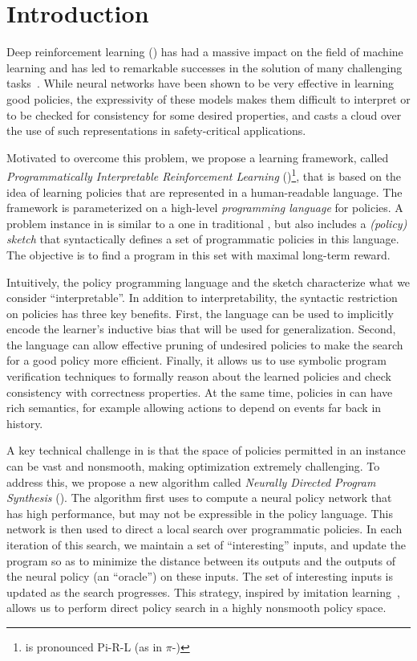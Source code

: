 \section{Introduction}\label{sec:intro}

Deep reinforcement learning (\drl) has had a massive impact on the
field of machine learning and has led to remarkable successes in the
solution of many challenging
tasks~\citep{mnih2015human,AlphaGo,silver2017mastering}.  While neural
networks have been shown to be very effective in learning good
policies, the expressivity of these models makes them difficult to
interpret or to be checked for consistency for some desired
properties, and casts a cloud over the use of such representations in
safety-critical applications.

Motivated to overcome this problem, we propose a learning framework,
called {\em Programmatically Interpretable Reinforcement Learning}
(\pirl)\footnote{\pirl is pronounced Pi-R-L (as in $\pi$-\rl)}, that is based on the idea of learning policies that are
represented in a human-readable language.  The \pirl framework is
parameterized on a high-level {\em programming language} for policies.
A problem instance in \pirl is similar to a one in traditional \rl,
but also includes a {\em (policy) sketch} that syntactically defines a set of programmatic policies
in this language.  The objective is to find a program in this set with
maximal long-term reward.

Intuitively, the policy programming language and the sketch characterize what we
consider ``interpretable''. In addition to interpretability, the
syntactic restriction on policies has three key benefits. First, the language
can be used to implicitly encode the learner's inductive bias that will
be used for generalization. Second, the language can allow effective
pruning of undesired policies to make the search for a good policy
more efficient. Finally, it 
allows us to use symbolic program verification techniques to formally reason
about the learned policies and check consistency with correctness
properties. At the same time, policies in \pirl can have rich 
semantics, for example allowing actions to depend on events far back
in history. 

A key technical challenge in \pirl is that the space of policies
permitted in an instance can be vast and nonsmooth, making
optimization extremely challenging. To address this, we propose a new
algorithm called {\em Neurally Directed Program Synthesis}
(\algo). The algorithm first uses \drl to compute a neural policy
network that has high performance, but may not be expressible in the
policy language. This network is then used to direct a local search
over programmatic policies. In each iteration of this search, we
maintain a set of ``interesting'' inputs, and update the program so as
to minimize the distance between its outputs and the outputs of the
neural policy (an ``oracle'') on these inputs. The set of interesting
inputs is updated as the search progresses. This strategy, inspired by
imitation learning~\cite{dagger,schaal1999imitation}, allows us to
perform direct policy search in a highly nonsmooth policy space.

